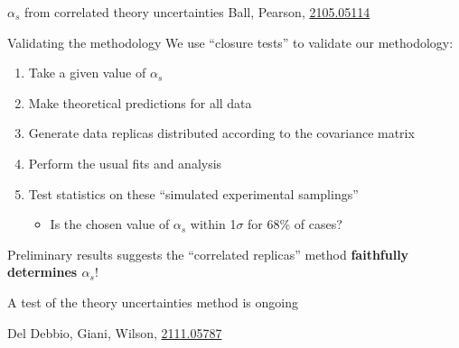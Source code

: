 \documentclass[8pt,t]{beamer}
\begin{document}
\begin{frame}{$\alpha_s$ from correlated theory uncertainties}
  \vspace*{1em}
  {\color{gray} \footnotesize Ball, Pearson, \hyperlink{https://arxiv.org/abs/2105.05114}{2105.05114}}

\end{frame}


\begin{frame}{Validating the methodology}
  We use ``closure tests'' to validate our methodology:
  \begin{enumerate}
    \item Take a given value of $\alpha_s$
    \item Make theoretical predictions for all data
    \item Generate data replicas distributed according to the covariance matrix
    \item Perform the usual fits and analysis
    \item Test statistics on these ``simulated experimental samplings''
    \begin{itemize}
      \item Is the chosen value of $\alpha_s$ within 1$\sigma$ for 68\% of cases?
    \end{itemize}
  \end{enumerate}

  \vspace{1em}
  Preliminary results suggests the “correlated replicas” method \textbf{faithfully determines $\alpha_s$}!

  \vspace{1em}
  A test of the theory uncertainties method is ongoing


  \vspace*{1em}
  {\color{gray} \footnotesize Del Debbio, Giani, Wilson, \hyperlink{https://arxiv.org/abs/2111.05787}{2111.05787}}

\end{frame}
\end{document}
